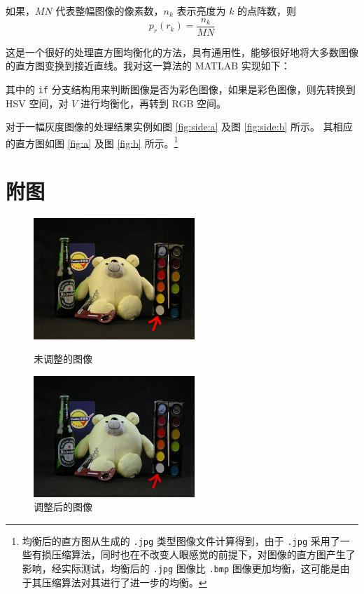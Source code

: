 \documentclass[a4paper,10pt]{article}
\theoremstyle{definition}
\theoremstyle{plain}
\begin{document}
如果，$MN$ 代表整幅图像的像素数，$n_k$ 表示亮度为 $k$ 的点阵数，则
\begin{equation}
 p_r(r_k)=\frac{n_k}{MN}
\end{equation}

这是一个很好的处理直方图均衡化的方法，具有通用性，能够很好地将大多数图像的直方图变换到接近直线。我对这一算法的 MATLAB 实现如下：


其中的 {\tt if} 分支结构用来判断图像是否为彩色图像，如果是彩色图像，则先转换到 HSV 空间，对 $V$ 进行均衡化，再转到 RGB 空间。

对于一幅灰度图像的处理结果实例如图 \ref{fig:side:a} 及图 \ref{fig:side:b} 所示。
其相应的直方图如图 \ref{fig:a} 及图 \ref{fig:b} 所示。\footnote{均衡后的直方图从生成的 {\tt *.jpg} 类型图像文件计算得到，由于 {\tt *.jpg} 采用了一些有损压缩算法，同时也在不改变人眼感觉的前提下，对图像的直方图产生了影响，经实际测试，均衡后的 {\tt *.jpg} 图像比 {\tt *.bmp} 图像更加均衡，这可能是由于其压缩算法对其进行了进一步的均衡。}

\section{附图}
\begin{figure}[h]
\begin{minipage}[h]{0.5\linewidth}
\centering
\includegraphics[width=2.4in]{color_balance.jpg}
\caption{未调整的图像}
\label{a}
\end{minipage}%
\begin{minipage}[h]{0.5\linewidth}
\centering
\includegraphics[width=2.4in]{color_bd.jpg}
\caption{调整后的图像}
\label{b}
\end{minipage}
\end{figure}


\end{document}
